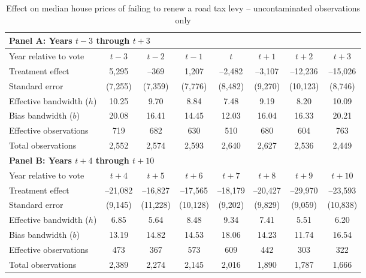 \begin{table}[H]
  \centering
  \caption{Effect on median house prices of failing to renew a road tax levy -- uncontaminated observations only}
  \label{tab:uncontaminated}
  \begin{threeparttable}
  \begin{tabular}{p{4.5cm}ccccccc}
    \toprule
    \multicolumn{8}{l}{\textbf{Panel A: Years $t-3$ through $t+3$}}\\
    \midrule
    Year relative to vote      & $t\!-\!3$ & $t\!-\!2$ & $t\!-\!1$ & $t$ & $t\!+\!1$ & $t\!+\!2$ & $t\!+\!3$\\
    \midrule
    Treatment effect           &  5,295 &     –369 &   1,207 &   –2,482 &   –3,107 &  –12,236 &  –15,026 \\
    Standard error             & (7,255)& (7,359) & (7,776) & (8,482) & (9,270) & (10,123) & (8,746) \\
    Effective bandwidth ($h$)  & 10.25  &  9.70  &  8.84  &  7.48  &  9.19  &  8.20  & 10.09  \\
    Bias bandwidth ($b$)       & 20.08  & 16.41  & 14.45  & 12.03  & 16.04  & 16.33  & 20.21  \\
    Effective observations     &   719  &   682  &   630  &   510  &   680  &   604  &   763  \\
    Total observations         & 2,552  & 2,574  & 2,593  & 2,640  & 2,627  & 2,536  & 2,449  \\
    \midrule
    \multicolumn{8}{l}{\textbf{Panel B: Years $t+4$ through $t+10$}}\\
    \midrule
    Year relative to vote      & $t\!+\!4$ & $t\!+\!5$ & $t\!+\!6$ & $t\!+\!7$ & $t\!+\!8$ & $t\!+\!9$ & $t\!+\!10$\\
    \midrule
    Treatment effect           &  –21,082 &  –16,827 &  –17,565 &  –18,179 &  –20,427 &  –29,970 &  –23,593 \\
    Standard error             &  (9,145) & (11,228) & (10,128) &  (9,202) &  (9,829) &  (9,059) & (10,838) \\
    Effective bandwidth ($h$)  &   6.85  &  5.64  &  8.48  &  9.34  &  7.41  &  5.51  &  6.20  \\
    Bias bandwidth ($b$)       &  13.19  & 14.82  & 14.53  & 18.06  & 14.23  & 11.74  & 16.54  \\
    Effective observations     &    473  &   367  &   573  &   609  &   442  &   303  &   322  \\
    Total observations         &  2,389  & 2,274  & 2,145  & 2,016  & 1,890  & 1,787  & 1,666  \\

\end{tabular}
\end{threeparttable}
\end{table}
